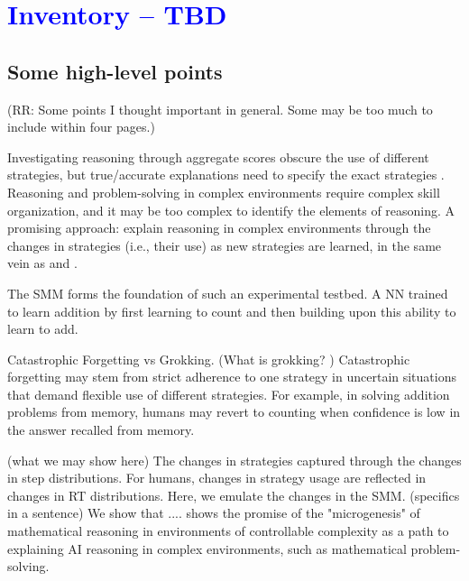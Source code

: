 \documentclass{article}
\newcommand{\rrsuggestion}[1]{\textcolor{blue}{#1}}
\begin{document}
\section*{\rrsuggestion{Inventory -- TBD}}



\subsection*{Some high-level points}

(RR: Some points I thought important in general. Some may be too much to include within four pages.)

Investigating reasoning through aggregate scores obscure the use of different strategies, but true/accurate explanations need to specify the exact strategies \citep{newell1958elements, simon1971human, simon1976substantive, siegler1987perils, shrager1998scads, gigerenzer2020explain}. Reasoning and problem-solving in complex environments require complex skill organization, and it may be too complex to identify the elements of reasoning. A promising approach: explain reasoning in complex environments through the changes in strategies (i.e., their use) as new strategies are learned, in the same vein as \citet{siegler1984strategychoices} and \citet{shrager1998scads}.

The SMM forms the foundation of such an experimental testbed. A NN trained to learn addition by first learning to count and then building upon this ability to learn to add.

Catastrophic Forgetting vs Grokking. (What is grokking? \citet{nanda2023progress}) Catastrophic forgetting may stem from strict adherence to one strategy in uncertain situations that demand flexible use of different strategies. For example, in solving addition problems from memory, humans may revert to counting when confidence is low in the answer recalled from memory.

(what we may show here) The changes in strategies captured through the changes in step distributions. For humans, changes in strategy usage are reflected in changes in RT distributions. Here, we emulate the changes in the SMM. (specifics in a sentence) We show that .... shows the promise of the "microgenesis" of mathematical reasoning in environments of controllable complexity as a path to explaining AI reasoning in complex environments, such as mathematical problem-solving.
\end{document}
